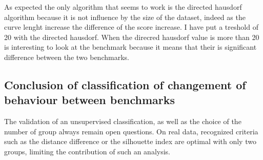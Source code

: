 \documentclass{article}
\begin{document}
As expected the only algorithm that seems to work is the directed hausdorf algorithm because it is not influence by the size of the dataset, indeed as the curve lenght increase the difference of the score increase. 
I have put a treshold of 20 with the directed hausdorf. When the direcred hausdorf value is more than 20 is interesting to look at the benchmark because it means that their is significant difference between the two benchmarks.

\subsection{Conclusion of classification of changement of behaviour between benchmarks}

The validation of an unsupervised classification, as well as the choice of the number of group always remain open questions. On real data, recognized criteria such as the distance difference or the silhouette index are optimal with only two groups, limiting the contribution of such an analysis.
\end{document}
